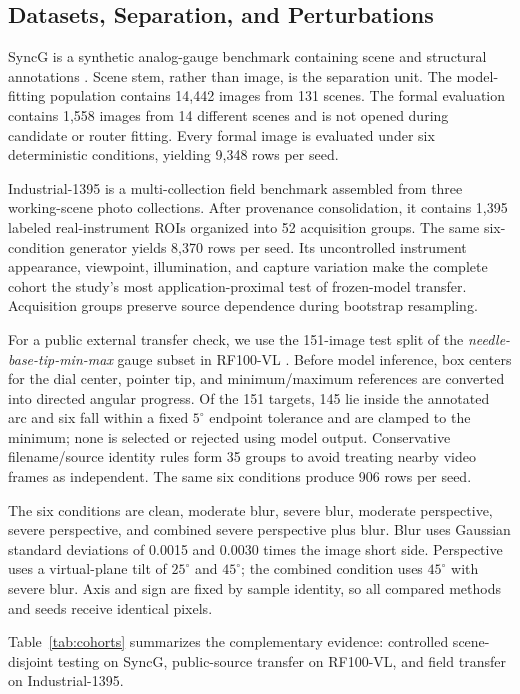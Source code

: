 \documentclass[electronics,article,submit,oneauthor]{Definitions/mdpi}
\begin{document}
\subsection{Datasets, Separation, and Perturbations}
\label{subsec:data}

SyncG is a synthetic analog-gauge benchmark containing scene and structural annotations \cite{deng2026syncg}. Scene stem, rather than image, is the separation unit. The model-fitting population contains 14,442 images from 131 scenes. The formal evaluation contains 1,558 images from 14 different scenes and is not opened during candidate or router fitting. Every formal image is evaluated under six deterministic conditions, yielding 9,348 rows per seed.

Industrial-1395 is a multi-collection field benchmark assembled from three working-scene photo collections. After provenance consolidation, it contains 1,395 labeled real-instrument ROIs organized into 52 acquisition groups. The same six-condition generator yields 8,370 rows per seed. Its uncontrolled instrument appearance, viewpoint, illumination, and capture variation make the complete cohort the study's most application-proximal test of frozen-model transfer. Acquisition groups preserve source dependence during bootstrap resampling.

For a public external transfer check, we use the 151-image test split of the \emph{needle-base-tip-min-max} gauge subset in RF100-VL \cite{robicheaux2025rf100vl}. Before model inference, box centers for the dial center, pointer tip, and minimum/maximum references are converted into directed angular progress. Of the 151 targets, 145 lie inside the annotated arc and six fall within a fixed $5^{\circ}$ endpoint tolerance and are clamped to the minimum; none is selected or rejected using model output. Conservative filename/source identity rules form 35 groups to avoid treating nearby video frames as independent. The same six conditions produce 906 rows per seed.

The six conditions are clean, moderate blur, severe blur, moderate perspective, severe perspective, and combined severe perspective plus blur. Blur uses Gaussian standard deviations of 0.0015 and 0.0030 times the image short side. Perspective uses a virtual-plane tilt of $25^{\circ}$ and $45^{\circ}$; the combined condition uses $45^{\circ}$ with severe blur. Axis and sign are fixed by sample identity, so all compared methods and seeds receive identical pixels.

Table~\ref{tab:cohorts} summarizes the complementary evidence: controlled scene-disjoint testing on SyncG, public-source transfer on RF100-VL, and field transfer on Industrial-1395.
\end{document}
